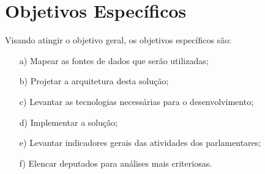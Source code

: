 \section{Objetivos Específicos}
Visando atingir o objetivo geral, os objetivos específicos são:
\begin{enumerate} 
 \item [a)] Mapear as fontes de dados que serão utilizadas; 
 \item [b)] Projetar a arquitetura desta solução;
 \item [c)] Levantar as tecnologias necessárias para o desenvolvimento;
 \item [d)] Implementar a solução;
 \item [e)] Levantar indicadores gerais das atividades dos parlamentares;
 \item [f)] Elencar deputados para análises mais criteriosas.
\end{enumerate} 
